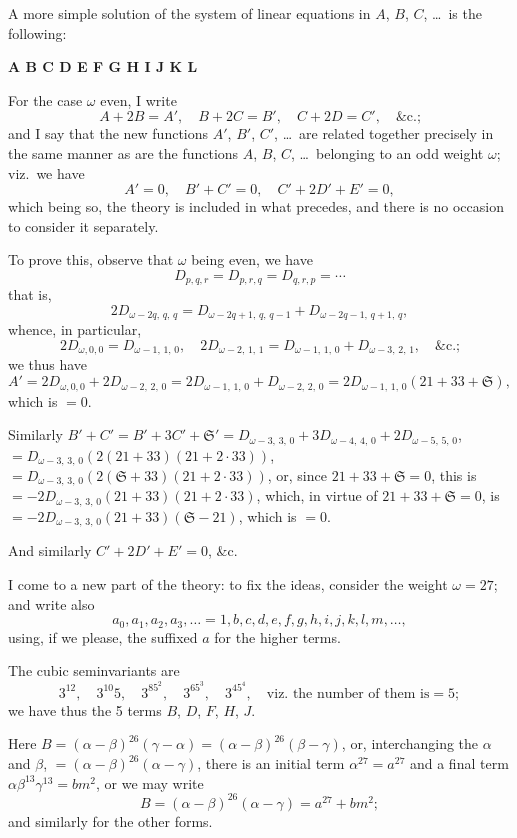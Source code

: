 \documentclass[11pt,a4paper]{article}
\theoremstyle{definition}
\begin{document}
A more simple solution of the system of linear equations in $A$, $B$, $C$, \ldots\ is the following:

\medskip
\begin{center}
\textbf{A B C D E F G H I J K L}
\end{center}
\medskip

For the case $\omega$ even, I write
\[
A + 2B = A', \quad B + 2C = B', \quad C + 2D = C', \quad \text{\&c.;}
\]
and I say that the new functions $A'$, $B'$, $C'$, \ldots\ are related together precisely in the same manner as are the functions $A$, $B$, $C$, \ldots\ belonging to an odd weight $\omega$; viz.\ we have
\[
A' = 0, \quad B' + C' = 0, \quad C' + 2D' + E' = 0,
\]
which being so, the theory is included in what precedes, and there is no occasion to consider it separately.

To prove this, observe that $\omega$ being even, we have
\[
D_{p,q,r} = D_{p,r,q} = D_{q,r,p} = \cdots
\]
that is,
\[
2D_{\omega-2q,\,q,\,q} = D_{\omega-2q+1,\,q,\,q-1} + D_{\omega-2q-1,\,q+1,\,q},
\]
whence, in particular,
\[
2D_{\omega,0,0} = D_{\omega-1,\,1,\,0}, \quad 2D_{\omega-2,\,1,\,1} = D_{\omega-1,\,1,\,0} + D_{\omega-3,\,2,\,1}, \quad \text{\&c.;}
\]
we thus have
\[
A' = 2D_{\omega,0,0} + 2D_{\omega-2,\,2,\,0} = 2D_{\omega-1,\,1,\,0} + D_{\omega-2,\,2,\,0} = 2D_{\omega-1,\,1,\,0}(21 + 33 + \mathfrak{S}),
\]
which is $= 0$.

Similarly $B' + C' = B' + 3C' + \mathfrak{S}' = D_{\omega-3,\,3,\,0} + 3D_{\omega-4,\,4,\,0} + 2D_{\omega-5,\,5,\,0}$, $= D_{\omega-3,\,3,\,0}(2(21 + 33)(21 + 2\cdot 33))$, $= D_{\omega-3,\,3,\,0}(2(\mathfrak{S} + 33)(21 + 2\cdot 33))$, or, since $21 + 33 + \mathfrak{S} = 0$, this is $= -2D_{\omega-3,\,3,\,0}(21 + 33)(21 + 2\cdot 33)$, which, in virtue of $21 + 33 + \mathfrak{S} = 0$, is $= -2D_{\omega-3,\,3,\,0}(21 + 33)(\mathfrak{S} - 21)$, which is $= 0$.

And similarly $C' + 2D' + E' = 0$, \&c.

I come to a new part of the theory: to fix the ideas, consider the weight $\omega = 27$; and write also
\[
a_0, a_1, a_2, a_3, \ldots = 1, b, c, d, e, f, g, h, i, j, k, l, m, \ldots,
\]
using, if we please, the suffixed $a$ for the higher terms.

The cubic seminvariants are
\[
3^{12}, \quad 3^{10}5, \quad 3^85^2, \quad 3^65^3, \quad 3^45^4, \quad \text{viz.\ the number of them is} = 5;
\]
we have thus the 5 terms $B$, $D$, $F$, $H$, $J$.

Here $B = (\alpha - \beta)^{26}(\gamma - \alpha) = (\alpha - \beta)^{26}(\beta - \gamma)$, or, interchanging the $\alpha$ and $\beta$, $= (\alpha - \beta)^{26}(\alpha - \gamma)$, there is an initial term $\alpha^{27} = a^{27}$ and a final term $\alpha\beta^{13}\gamma^{13} = bm^2$, or we may write
\[
B = (\alpha - \beta)^{26}(\alpha - \gamma) = a^{27} + bm^2;
\]
and similarly for the other forms.
\end{document}
